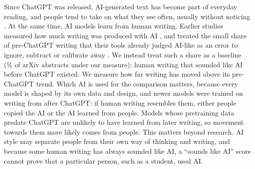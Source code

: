 \documentclass[11pt]{article}
\begin{document}
Since ChatGPT was released, AI-generated text has become part of everyday reading, and people tend to take on what
they see often, usually without noticing \citep{yakura2024, anderson2025spoken}. At the same time, AI models learn
from human writing. Earlier studies measured how much writing was produced with AI \citep{kobak2025,
liang2024monitoring, liang2024mapping, liang2025widespread, brooks2024}, and treated the small share of pre-ChatGPT
writing that their tools already judged AI-like as an error to ignore, subtract or calibrate away
\citep{liang2024mapping, lin2025, brooks2024}. We instead treat such a share as a baseline
(\% of arXiv abstracts under our measure): human writing that sounded like AI
before ChatGPT existed. We measure how far writing has moved above its pre-ChatGPT trend. Which AI is used for the
comparison matters, because every model is shaped by its own data and design, and newer models were trained on
writing from after ChatGPT: if human writing resembles them, either people copied the AI or the AI learned from
people. Models whose pretraining data predate ChatGPT are unlikely to have learned from later writing, so movement
towards them more likely comes from people. This matters beyond research. AI style may separate people from their
own way of thinking and writing, and because some human writing has always sounded like AI, a ``sounds like AI''
score cannot prove that a particular person, such as a student, used AI.
\end{document}
